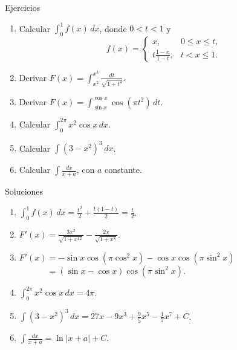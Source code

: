 \documentclass[main.tex]{subfiles}
\begin{document}
\begin{frame}{Ejercicios}
\scriptsize\begin{enumerate}\item Calcular $\int_0^1 f(x)\,dx$, donde $0<t<1$ y\[f(x)=\begin{cases}x,&0\le x\le t,\\\displaystyle t\frac{1-x}{1-t},&t<x\le1.\end{cases}\]\item Derivar $F(x)=\displaystyle\int_{x^2}^{x^3}\frac{dt}{\sqrt{1+t^4}}$.\item Derivar $F(x)=\displaystyle\int_{\sin x}^{\cos x}\cos(\pi t^2)\,dt$.\item Calcular $\displaystyle\int_0^{2\pi}x^2\cos x\,dx$.\item Calcular $\displaystyle\int(3-x^2)^3\,dx$.\item Calcular $\displaystyle\int\frac{dx}{x+a}$, con $a$ constante.\end{enumerate}
\end{frame}

\begin{frame}{Soluciones}
\footnotesize\begin{enumerate}\item $\displaystyle\int_0^1f(x)\,dx=\frac{t^2}{2}+\frac{t(1-t)}2=\boxed{\frac t2}$.\item $\displaystyle F\prime(x)=\frac{3x^2}{\sqrt{1+x^{12}}}-\frac{2x}{\sqrt{1+x^8}}$.\item $\displaystyle F\prime(x)=-\sin x\cos(\pi\cos^2x)-\cos x\cos(\pi\sin^2x)$\\$\displaystyle\phantom{F\prime(x)}=(\sin x-\cos x)\cos(\pi\sin^2x)$.\item $\displaystyle\int_0^{2\pi}x^2\cos x\,dx=4\pi$.\item $\displaystyle\int(3-x^2)^3\,dx=27x-9x^3+\frac95x^5-\frac17x^7+C$.\item $\displaystyle\int\frac{dx}{x+a}=\ln|x+a|+C$.\end{enumerate}
\end{frame}
\end{document}
